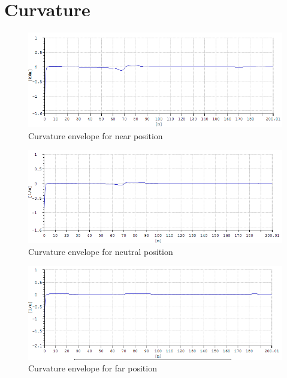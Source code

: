 \section{Curvature}

\begin{figure}[H]
\centering
\includegraphics[scale=0.5]{figures/envcurvenear}
\caption[$\; \:$Curvature envelope for near position]{Curvature envelope for near position}
 \label{fig:envcurvenear}
\end{figure}

\begin{figure}[H]
\centering
\includegraphics[scale=0.5]{figures/envcurveneu}
\caption[$\; \:$Curvature envelope for neutral position]{Curvature envelope for neutral position}
 \label{fig:envcurveneu}
\end{figure}

\begin{figure}[H]
\centering
\includegraphics[scale=0.5]{figures/envcurvefar}
\caption[$\; \:$Curvature envelope for far position]{Curvature envelope for far position}
 \label{fig:envcurvefar}
\end{figure}

